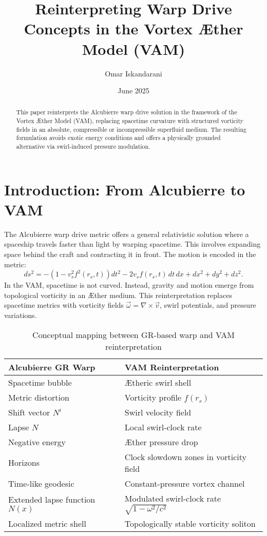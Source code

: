 \documentclass[12pt]{article}
\title{Reinterpreting Warp Drive Concepts in the Vortex Æther Model (VAM)}
\author{Omar Iskandarani}
\date{June 2025}
\begin{document}
\maketitle

\begin{abstract}
This paper reinterprets the Alcubierre warp drive solution in the framework of the Vortex Æther Model (VAM), replacing spacetime curvature with structured vorticity fields in an absolute, compressible or incompressible superfluid medium. The resulting formulation avoids exotic energy conditions and offers a physically grounded alternative via swirl-induced pressure modulation.
\end{abstract}

\section{Introduction: From Alcubierre to VAM}
The Alcubierre warp drive metric \cite{alcubierre1994warp} offers a general relativistic solution where a spaceship travels faster than light by warping spacetime. This involves expanding space behind the craft and contracting it in front. The motion is encoded in the metric:
\begin{equation}
    ds^2 = -\left(1 - v_s^2 f^2(r_s, t)\right)dt^2 - 2 v_s f(r_s, t)\,dt\,dx + dx^2 + dy^2 + dz^2.
\end{equation}
In the VAM, spacetime is not curved. Instead, gravity and motion emerge from topological vorticity in an Æther medium. This reinterpretation replaces spacetime metrics with vorticity fields \( \vec{\omega} = \nabla \times \vec{v} \), swirl potentials, and pressure variations.



\begin{table}[H]
    \centering
    \footnotesize
    \renewcommand{\arraystretch}{1.3}
    \begin{tabular}{|l|l|}
        \hline
        \textbf{Alcubierre GR Warp} & \textbf{VAM Reinterpretation} \\
        \hline
        Spacetime bubble & Ætheric swirl shell \\
        Metric distortion & Vorticity profile $f(r_s)$ \\
        Shift vector $N^i$ & Swirl velocity field \\
        Lapse $N$ & Local swirl-clock rate \\
        Negative energy & Æther pressure drop \\
        Horizons & Clock slowdown zones in vorticity field \\
        Time-like geodesic & Constant-pressure vortex channel \\
        Extended lapse function $N(x)$ & Modulated swirl-clock rate $\sqrt{1 - \omega^2/c^2}$ \\
        Localized metric shell & Topologically stable vorticity soliton \\
        \hline
    \end{tabular}
    \caption{Conceptual mapping between GR-based warp and VAM reinterpretation}
\end{table}
\end{document}
